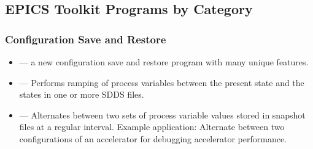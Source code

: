 \documentclass[11pt]{article}
\begin{document}
\subsection{EPICS Toolkit Programs by Category}
\subsubsection{Configuration Save and Restore}
\begin{itemize}
\item {} --- a new configuration save and restore program with many unique features.
\item {} --- Performs ramping of process variables between
the present state and the states in one or more SDDS files.
\item {} --- Alternates between two sets of process variable values stored in snapshot files
        at a regular interval.
        Example application: Alternate between two configurations of an accelerator for debugging
        accelerator performance.
\end{itemize}
\end{document}
